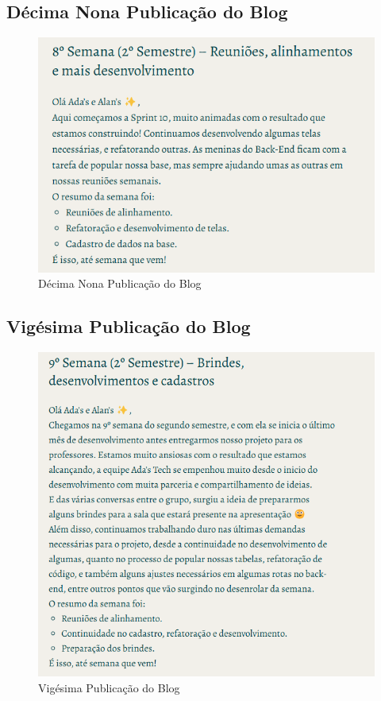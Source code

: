 \begin{apendicesenv}
\subsection*{Décima Nona Publicação do Blog}
\begin{figure}[H]
    \centering
    \includegraphics[width=1.0\linewidth]{images/post19.png}
    \caption{Décima Nona Publicação do Blog}
    \label{fig:decima primeira}
\end{figure}

\subsection*{Vigésima Publicação do Blog}
\begin{figure}[H]
    \centering
    \includegraphics[width=1.0\linewidth]{images/post20.png}
    \caption{Vigésima Publicação do Blog}
    \label{fig:decima primeira}
\end{figure}


\end{apendicesenv}
